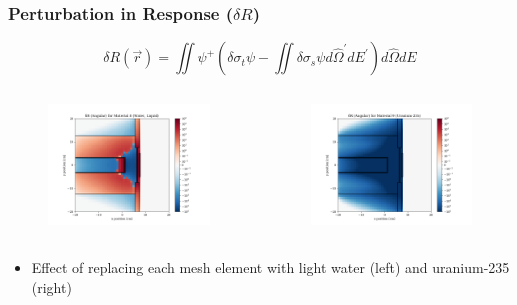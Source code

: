 \documentclass[t]{beamer}
\begin{document}
\begin{frame}
  \frametitle{Perturbation in Response ($\delta R$)}
  \vskip-0.25in
  \begin{equation*}
    \delta R\left(\vec{r}\right) = \iint\psi^+\left(\delta\sigma_t\psi - \iint\delta\sigma_s\psi d\hat{\Omega}^\prime dE^\prime\right)d\hat{\Omega}dE
  \end{equation*}
  \vskip-0.25in
  \begin{columns}
    \begin{figure}
      \includegraphics[trim={0.7in 0.15in 1.05in 0.4in},clip,scale=0.36]{images/dR_angular_08.png}
    \end{figure}
    \begin{figure}
      \includegraphics[trim={0.7in 0.15in 1.05in 0.4in},clip,scale=0.36]{images/dR_angular_09.png}
    \end{figure}
  \end{columns}
  \begin{itemize}
    \item Effect of replacing each mesh element with light water (left) and
          uranium-235 (right)
  \end{itemize}
\end{frame}
\end{document}
